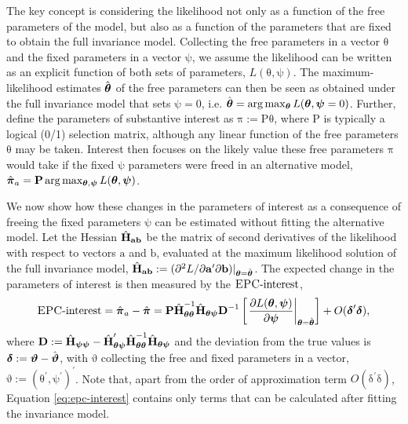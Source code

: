 \documentclass[letterpaper,12pt]{article}
\newcommand\vm[1]{%
\bm{\mathrm{#1}}}
\newcommand{\param}{\vm{\theta}}
\newcommand{\bpsi}{\vm{\psi}}
\newcommand{\that}{\hat{\vm{\theta}}}
\newcommand{\da}{\textrm{{\sc {EPC}}-interest}}
\begin{document}
The key concept is considering the likelihood not only as a function of the free parameters of the model, but also as a function of the parameters that are fixed to obtain the full invariance model. Collecting the free parameters in a vector $\param$ and the fixed parameters in a vector $\bpsi$, we assume the likelihood can be written as an explicit function of both sets of parameters, $L(\param, \bpsi)$.  The maximum-likelihood estimates $\that$ of the free parameters can then be seen as obtained under the full invariance model that sets $\bpsi=0$, i.e. $\that = \arg\max_{\param} L(\param, \bpsi = 0)$. Further, define the parameters of substantive interest as $\vm{\pi} := \vm{P} \param$, where $\vm{P}$ is typically a logical (0/1) selection matrix, although any linear function of the free parameters $\param$ may be taken. 
Interest then focuses on the likely value these free parameters $\vm{\pi}$ would take if the fixed $\bpsi$ parameters were freed in an alternative model, $\hat{\vm{\pi}}_a = \vm{P} \arg\max_{\param, \bpsi} L(\param, \bpsi)$. 

We now show how these changes in the parameters of interest as a consequence of freeing the fixed parameters $\bpsi$ can be estimated without fitting the alternative model. Let the Hessian $\hat{\vm{H}}_{\vm{a}\vm{b}}$ be the matrix of second derivatives of the likelihood with respect to vectors $\vm{a}$ and $\vm{b}$, evaluated at the maximum likelihood solution of the full invariance model, $\hat{\vm{H}}_{\vm{a}\vm{b}} := (\partial^2 L /\partial \vm{a}^\prime \partial \vm{b})|_{\param=\that}$. 
The expected change in the parameters of interest is then measured by the $\da$, 
\begin{equation}
\da = \hat{\vm{\pi}}_a - \hat{\vm{\pi}} = \vm{P}
\hat{\vm{H}}^{-1}_{\param\param} \hat{\vm{H}}_{\param\bpsi}\vm{D}^{-1}
		\left[ \left.\frac{\partial L(\param, \bpsi)}{\partial \bpsi}\right|_{\param = \that} \right] +	
		O(\vm{\delta}^\prime\vm{\delta}),
		\label{eq:epc-interest}
\end{equation}
where $\vm{D}:= \hat{\vm{H}}_{\bpsi\bpsi} - \hat{\vm{H}}_{\param\bpsi}^\prime \hat{\vm{H}}^{-1}_{\param\param} \hat{\vm{H}}_{\param\bpsi}$ and the deviation from the true values is $\vm{\delta}:= \vm{\vartheta} - \hat{\vm{\vartheta}}$, with $\vm{\vartheta}$ collecting the free and fixed parameters in a vector, $\vm{\vartheta}:= (\param^\prime, \bpsi^\prime)^\prime$. Note that, apart from the order of approximation term $O(\vm{\delta}^\prime \vm{\delta})$,  Equation \ref{eq:epc-interest} contains only terms that can be calculated after fitting the invariance model.
\end{document}
